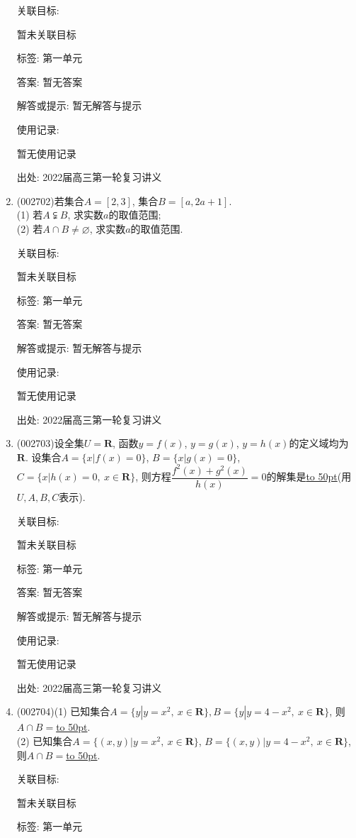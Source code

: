 \documentclass[10pt,a4paper]{article}
\newcommand{\blank}[1]{\underline{\hbox to #1pt{}}}
\begin{document}
\begin{enumerate}[1.]
关联目标:

暂未关联目标



标签: 第一单元

答案: 暂无答案

解答或提示: 暂无解答与提示

使用记录:

暂无使用记录


出处: 2022届高三第一轮复习讲义
\item { (002702)}若集合$A=[2,3]$, 集合$B=[a,2a+1]$.\\
(1) 若$A\subsetneqq B$, 求实数$a$的取值范围;\\
(2) 若$A\cap B\ne \varnothing$, 求实数$a$的取值范围.


关联目标:

暂未关联目标



标签: 第一单元

答案: 暂无答案

解答或提示: 暂无解答与提示

使用记录:

暂无使用记录


出处: 2022届高三第一轮复习讲义
\item { (002703)}设全集$U=\mathbf{R}$, 函数$y=f(x)$, $y=g(x)$, $y=h(x)$的定义域均为$\mathbf{R}$. 设集合$A=\{x|f(x)=0\}$, $B=\{x|g(x)=0\}$, $C=\{x|h(x)=0, \ x\in \mathbf{R}\}$, 则方程$\dfrac{f^2(x)+g^2(x)}{h(x)}=0$的解集是\blank{50}(用$U,A,B,C$表示).


关联目标:

暂未关联目标



标签: 第一单元

答案: 暂无答案

解答或提示: 暂无解答与提示

使用记录:

暂无使用记录


出处: 2022届高三第一轮复习讲义
\item { (002704)}(1) 已知集合$A=\{y|y=x^2, \ x\in \mathbf{R}\}, B=\{y|y=4-x^2, \ x\in \mathbf{R}\}$, 则$A\cap B=$\blank{50}.\\
(2) 已知集合$A=\{(x,y)|y={x^2},\ x\in \mathbf{R}\}$, $B=\{(x,y)|y=4-x^2, \ x\in \mathbf{R}\}$, 则$A\cap B=$\blank{50}.


关联目标:

暂未关联目标



标签: 第一单元


\end{enumerate}
\end{document}
